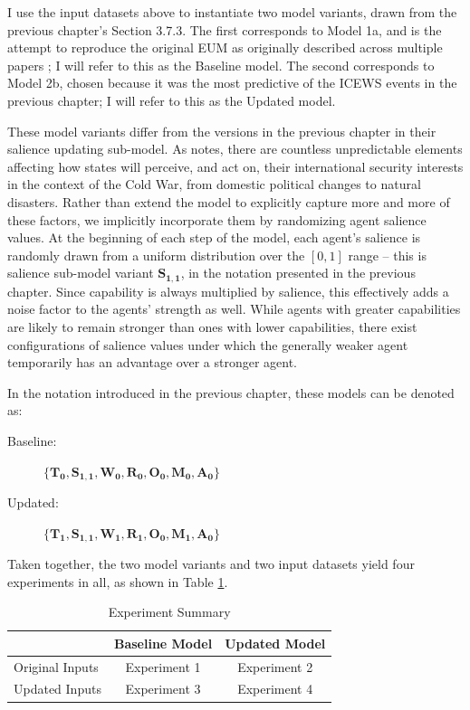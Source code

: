 I use the input datasets above to instantiate two model variants, drawn from the previous chapter's Section 3.7.3. The first corresponds to Model 1a, and is the attempt to reproduce the original EUM as originally described across multiple papers \citep{bdm_1994,bdm_1997,bdm_2002}; I will refer to this as the Baseline model. The second corresponds to Model 2b, chosen because it was the most predictive of the ICEWS events in the previous chapter; I will refer to this as the Updated model.

These model variants differ from the versions in the previous chapter in their salience updating sub-model. As \citet{bdm_1998} notes, there are countless unpredictable elements affecting how states will perceive, and act on, their international security interests in the context of the Cold War, from domestic political changes to natural disasters. Rather than extend the model to explicitly capture more and more of these factors, we implicitly incorporate them by randomizing agent salience values. At the beginning of each step of the model, each agent's salience is randomly drawn from a uniform distribution over the ${[0, 1]}$ range -- this is salience sub-model variant $\mathbf{S_{1,1}}$, in the notation presented in the previous chapter. Since capability is always multiplied by salience, this effectively adds a noise factor to the agents' strength as well. While agents with greater capabilities are likely to remain stronger than ones with lower capabilities, there exist configurations of salience values under which the generally weaker agent temporarily has an advantage over a stronger agent.


In the notation introduced in the previous chapter, these models can be denoted as:

\begin{description}
  \item[Baseline:] $\{\mathbf{T_0, S_{1,1}, W_0, R_0, O_0, M_0, A_0}\}$ 
  \item[Updated:] $\{\mathbf{T_1, S_{1,1}, W_1, R_1, O_0, M_1, A_0}\}$
\end{description}

Taken together, the two model variants and two input datasets yield four experiments in all, as shown in Table \ref{table:experiment_matrix}.

\begin{table}
  \centering
  \caption{Experiment Summary}
    \label{table:experiment_matrix}
  \begin{tabular}{l|cc}
  \hline
                & Baseline Model &  Updated Model \\
  \hline
  Original Inputs & Experiment 1   & Experiment 2   \\
  Updated Inputs  & Experiment 3    & Experiment 4  \\
  \hline
\end{tabular}
    \tableSpace
\end{table}

